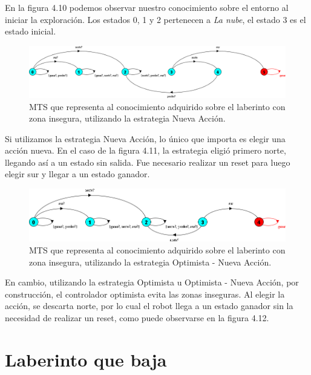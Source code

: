 En la figura 4.10 podemos observar nuestro conocimiento sobre el entorno al iniciar la exploración. Los estados 0, 1 y 2 pertenecen a \textit{La nube}, 
el estado 3 es el estado inicial.

\begin{figure}[H]
	\centering
		\includegraphics[width=1.0\textwidth]{Imagenes/Laberintos/unsafe_nueva_accion.png}
	\caption{MTS que representa al conocimiento adquirido sobre el laberinto con zona insegura, utilizando la estrategia Nueva Acción.}
	\label{fig:unsafe_nueva_accion}
\end{figure}

Si utilizamos la estrategia Nueva Acción, lo único que importa es elegir una acción nueva. En el caso de la figura 4.11, la estrategia eligió primero norte, 
llegando así a un estado sin salida. Fue necesario realizar un reset para luego elegir sur y llegar a un estado ganador.

\begin{figure}[H]
	\centering
		\includegraphics[width=1.0\textwidth]{Imagenes/Laberintos/unsafe_sintesis.png}
	\caption{MTS que representa al conocimiento adquirido sobre el laberinto con zona insegura, utilizando la estrategia Optimista - Nueva Acción.}
	\label{fig:unsafe_sintesis}
\end{figure}

En cambio, utilizando la estrategia Optimista u Optimista - Nueva Acción, por construcción, el controlador optimista evita las zonas inseguras. Al elegir la acción, 
se descarta norte, por lo cual el robot llega a un estado ganador sin la necesidad de realizar un reset, como puede observarse en la figura 4.12.

\clearpage

\section{Laberinto que baja}

